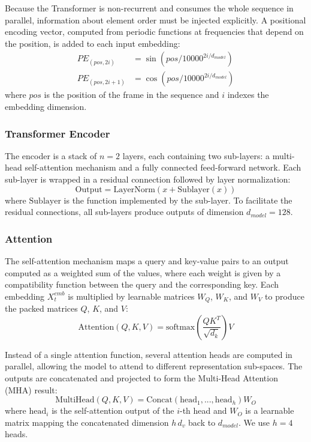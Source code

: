 \documentclass{article}
\begin{document}
Because the Transformer is non-recurrent and consumes the whole sequence in parallel, information about element order must be injected explicitly. A positional encoding vector, computed from periodic functions at frequencies that depend on the position, is added to each input embedding:
\begin{align}
    PE_{(pos, 2i)}&=\sin\!\left(pos/10000^{2i/d_{model}}\right) \label{eq:pos1} \\
    PE_{(pos, 2i+1)}&=\cos\!\left(pos/10000^{2i/d_{model}}\right) \label{eq:pos2}
\end{align}
where $pos$ is the position of the frame in the sequence and $i$ indexes the embedding dimension.

\subsubsection{Transformer Encoder}
The encoder is a stack of $n=2$ layers, each containing two sub-layers: a multi-head self-attention mechanism and a fully connected feed-forward network. Each sub-layer is wrapped in a residual connection followed by layer normalization:
\begin{equation}
    \label{eq:enc}
    \mathrm{Output}=\mathrm{LayerNorm}(x+\mathrm{Sublayer}(x))
\end{equation}
where $\mathrm{Sublayer}$ is the function implemented by the sub-layer. To facilitate the residual connections, all sub-layers produce outputs of dimension $d_{model}=128$.

\subsubsection{Attention}
The self-attention mechanism maps a query and key-value pairs to an output computed as a weighted sum of the values, where each weight is given by a compatibility function between the query and the corresponding key. Each embedding $X_t^{emb}$ is multiplied by learnable matrices $W_Q$, $W_K$, and $W_V$ to produce the packed matrices $Q$, $K$, and $V$:
\begin{equation}
    \label{eq:attn}
    \mathrm{Attention}(Q,K,V)=\mathrm{softmax}\!\left(\frac{QK^T}{\sqrt{d_k}}\right)V
\end{equation}

Instead of a single attention function, several attention heads are computed in parallel, allowing the model to attend to different representation sub-spaces. The outputs are concatenated and projected to form the Multi-Head Attention (MHA) result:
\begin{equation}
    \label{eq:mha}
    \mathrm{MultiHead}(Q,K,V)=\mathrm{Concat}(\mathrm{head}_1,...,\mathrm{head}_h)W_O
\end{equation}
where $\mathrm{head}_i$ is the self-attention output of the $i$-th head and $W_O$ is a learnable matrix mapping the concatenated dimension $h\,d_v$ back to $d_{model}$. We use $h=4$ heads.
\end{document}

